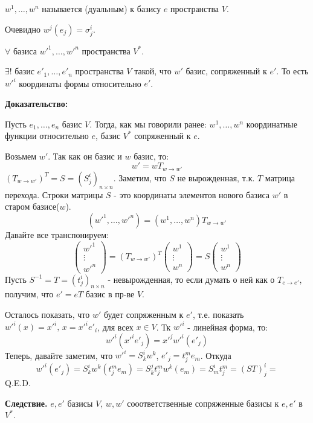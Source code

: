 $w^1,\ldots, w^n$ называется  (дуальным) к базису $e$ пространства $V$.

Очевидно $w^j(e_j) = \sigma^i_j$.


$\forall$ базиса $w'^1,\ldots, w'^n$ пространства $V^*$.

$\exists!$ базис $e'_1, \ldots, e'_n$ пространства $V$ такой, что $w'$ базис, сопряженный к $e'$. То есть $w'^{i} $ координаты формы относительно $e'$.

\textbf{Доказательство:}


Пусть $e_1,\dots ,e_n \text{ базис } V$. Тогда, как мы говорили ранее:
$ w^1,\dots,w^n $ координатные функции относительно $e$, базис $V^*$ сопряженный к $e$.

Возьмем $w'$. Так как он базис и $w$ базис, то: $$ w' =wT_{w \rightarrow w'}$$
$(T_{w \to w'})^T=S=(S^i_j)_{n\times n}$. Заметим, что $S$ не вырожденная, т.к. $T$ матрица перехода. Строки матрицы $S$ - это координаты элементов нового базиса $w'$ в старом базисе($w$).
$$(w'^1,\ldots,w'^n)=(w^1,\ldots,w^n)T_{w \to w'}$$
Давайте все транспонируем:
$$\begin{pmatrix}
    w'^1 \\
    \vdots \\
    {w'}^n
\end{pmatrix} = (T_{w \to w'})^T \begin{pmatrix}
    w^1 \\
    \vdots \\
    {w}^n
\end{pmatrix}= S \begin{pmatrix}
    w^1 \\
    \vdots \\
    {w}^n
\end{pmatrix}$$
Пусть $S^{-1}=T=(t^i_j)_{n \times n}$ - невырожденная, то если думать о ней как о $T_{e \to e'}$, получим, что $ e' = eT$ базис в пр-ве $V$.

Осталось показать, что $w'$ будет сопряженным к $e'$, т.е. показать ${w'}^{ i}(x)={x'}^i, \, x = {x'}^i {e'}_i$, для всех $ x \in V$. Тк $w'^i$ - линейная форма, то:
$${w'}^i({x'}^i{e'}_j)= {x'}^j {w'}^i(e'_j)$$
Теперь, давайте заметим, что ${w'}^i=S^i_kw^k$, $e'_j = t^m_je_m$. Откуда 
$$ {w'}^i(e'_j)=  S^i_kw^k(t^m_je_m)  = S_k^jt_{j}^m w^k(e_m) = S^i_mt^m_j=(ST)^i_j = $$
\hfill Q.E.D.

\textbf{Следствие.} $e,e'$ базисы $V$, $w,w'$ сооответственные сопряженные базисы к $e,e'$ в $V^*$.

